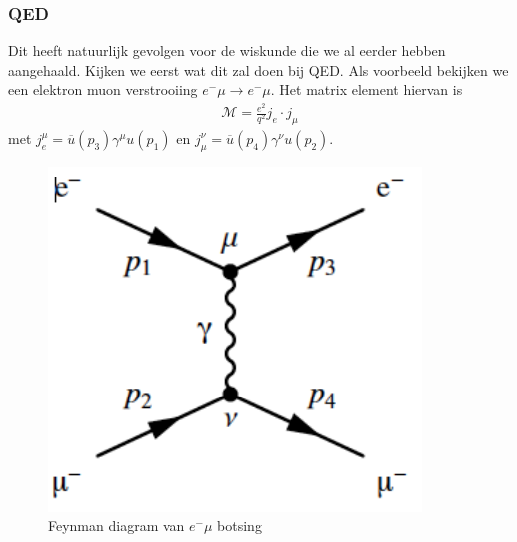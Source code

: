 \documentclass[../main.tex]{subfiles}
\begin{document}
\subsubsection{QED}%
\label{ssub:qed}

Dit heeft natuurlijk gevolgen voor de wiskunde die we al eerder hebben aangehaald. Kijken we eerst wat dit zal doen bij QED. Als voorbeeld bekijken we een elektron muon verstrooiing $e^-\mu\rightarrow e^-\mu$. Het matrix element hiervan is 
\begin{equation}
    \begin{aligned}
        \label{eq:e_mu_pariteit}
        \mathcal{M}= \frac{e^2}{q^2} j_e\cdot j_\mu
    \end{aligned}
\end{equation}
met $j_e^\mu = \overline u(p_3)\gamma^\mu u(p_1)$ en $j_\mu^\nu = \overline u(p_4)\gamma^\nu u(p_2)$.

\begin{figure}[h]
    \centering
    \includegraphics[width=0.4\linewidth]{parity_violation/diagram_e_mu.png}
    \caption{Feynman diagram van $e^- \mu$ botsing}%
    \label{fig:parity_violation/diagram_e_mu}
\end{figure}
\end{document}
